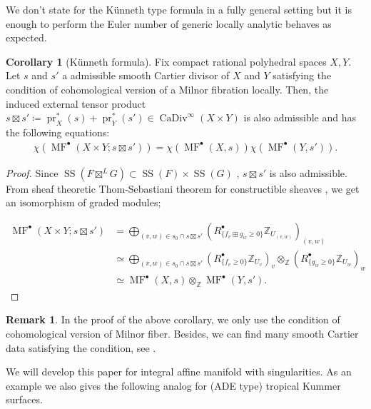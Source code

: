 \documentclass[a4paper,dvipdfmx,reqno,12pt]{amsart}
\theoremstyle{definition}
\newtheorem{corollary}[theorem]{Corollary}
\newtheorem{remark}[theorem]{Remark}
\newcommand{\deq}{\coloneqq}
\newcommand{\Z}{\mathbb{Z}}%
\newcommand{\opn}[1]{\operatorname{#1}}
\numberwithin{equation}{section}
\begin{document}
We don't state for the K\"unneth type formula in a fully
general setting but it is enough to perform the Euler number of
generic locally analytic  behaves as expected.
\begin{corollary}[{K\"unneth formula}]
Fix compact rational polyhedral spaces $X,Y$.
Let $s$ and $s'$ a admissible smooth Cartier divisor of $X$ and $Y$ 
satisfying the condition of cohomological version of a Milnor 
fibration \cite[Assumption 1.1.1]{MR2031639} locally.
Then, the induced external tensor product 
$s\boxtimes s'\deq \opn{pr}_X^{*} (s)+\opn{pr}_Y^{*}(s')
\in \opn{CaDiv}^{\infty}(X\times Y)$ is also admissible and
has the following equations:
\begin{align}
\chi(\opn{MF}^{\bullet}(X\times Y;s\boxtimes s'))=
\chi(\opn{MF}^{\bullet}(X,s))\chi(\opn{MF}^{\bullet}(Y,s')).
\end{align}

\end{corollary}
\begin{proof}
Since 
$\opn{SS}(F\boxtimes^{L} G)\subset \opn{SS}(F)\times \opn{SS}(G)$
\cite[Proposition 5.4.1]{MR1299726},
$s\boxtimes s'$ is also admissible.
From sheaf theoretic Thom-Sebastiani theorem for constructible sheaves 
\cite[Corollary 1.2.1]{MR2031639}, we get an isomorphism of 
graded modules;

\begin{align}
\opn{MF}^{\bullet}(X\times Y;s\boxtimes s') 
& =\bigoplus_{(v,w)\in s_0\cap s\boxtimes s'}
(R^{\bullet}_{\{f_v\boxplus g_w\geq 0\}}\Z_{U_{(v,w)}})_{(v,w)} \\
& \simeq \bigoplus_{(v,w)\in s_0\cap s\boxtimes s'}
(R^{\bullet}_{\{f_v\geq 0\}}\Z_{U_v})_v
\otimes_{\Z} (R^{\bullet}_{\{g_w\geq 0\}}\Z_{U_w})_w \\
& \simeq
\opn{MF}^{\bullet}(X,s)\otimes_{\Z} 
\opn{MF}^{\bullet}(Y,s').
\end{align}

\end{proof}

\begin{remark}
In the proof of the above corollary, we only use
the condition of cohomological version of Milnor fiber. 
Besides, we can find many smooth Cartier data satisfying 
the condition, see \cite[p.35]{MR2031639}.  
\end{remark}

We will develop this paper for integral affine manifold
with singularities. As an example we also gives the 
following analog for (ADE type) tropical Kummer surfaces.
\end{document}
